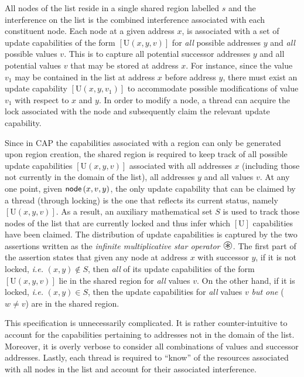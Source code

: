 All nodes of the list reside in a single shared region labelled $s$ and the interference on the list is the combined interference associated with each constituent node. 
Each node at a given address $x$, is associated with a set of update capabilities of the form $[\text{U}(x, y, v)]$ for \emph{all} possible addresses $y$ and \emph{all} possible values $v$. This is to capture all potential successor addresses $y$ and all potential values $v$ that may be stored at address $x$. For instance, since the value $v_{1}$ may be contained in the list at address $x$ before address $y$, there must exist an update capability $[\text{U}(x, y, v_1)]$ to accommodate possible modifications of value $v_{1}$ with respect to $x$ and $y$. In order to modify a node, a thread can acquire the lock associated with the node and subsequently claim the relevant update capability.
% 

Since in CAP the capabilities associated with a region can only be generated upon region creation, the shared region is required to keep track of all possible update capabilities $[\text{U}(x, y, v)]$ associated with all addresses $x$ (including those not currently in the domain of the list), all addresses $y$ and all values $v$. At any one point, given $\textsf{node}\left(x, v, y\right)$, the only update capability that can be claimed by a thread (through locking) is the one that reflects its current status, namely $[\text{U}(x, y, v)]$. As a result, an auxiliary mathematical set $S$ is used to track those nodes of the list that are currently locked and thus infer which $[\text{U}]$ capabilities have been claimed. The distribution of update capabilities is captured by the two assertions written as the \emph{infinite multiplicative star operator} $\iterStar$. The first part of the assertion states that given any node at address $x$ with successor $y$, if it is not locked, \textit{i.e.} $(x, y) \not\in S$, then \emph{all} of its update capabilities of the form $[\text{U}(x, y, v)]$ lie in the shared region for \emph{all} values $v$. On the other hand, if it is locked, \textit{i.e.} $(x, y) \in S$, then the update capabilities for \emph{all} values $v$ \emph{but one} ($w \not= v$) are in the shared region.

This specification is unnecessarily complicated. It is rather counter-intuitive to account for the capabilities pertaining to addresses not in the domain of the list. Moreover, it is overly verbose to consider all combinations of values and successor addresses. Lastly, each thread is required to ``know'' of the resources associated with all nodes in the list and account for their associated interference. 

